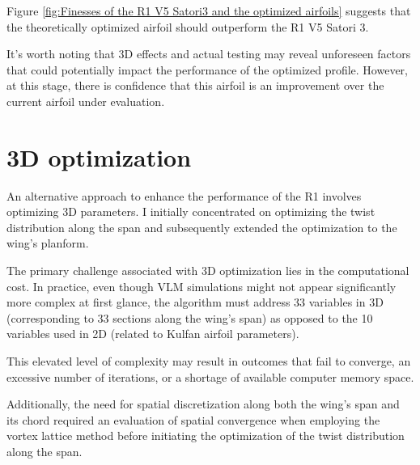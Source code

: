 Figure \ref{fig:Finesses of the R1 V5 Satori3 and the optimized airfoils} suggests that the theoretically optimized airfoil should outperform the R1 V5 Satori 3. 

It's worth noting that 3D effects and actual testing may reveal unforeseen factors that could potentially impact the performance of the optimized profile. However, at this stage, there is confidence that this airfoil is an improvement over the current airfoil under evaluation.



\section{3D optimization}
\label{sec:Ch2.3}

An alternative approach to enhance the performance of the R1 involves optimizing 3D parameters. I initially concentrated on optimizing the twist distribution along the span and subsequently extended the optimization to the wing's planform. 

The primary challenge associated with 3D optimization lies in the computational cost. In practice, even though VLM simulations might not appear significantly more complex at first glance, the algorithm must address 33 variables in 3D (corresponding to 33 sections along the wing's span) as opposed to the 10 variables used in 2D (related to Kulfan airfoil parameters).

This elevated level of complexity may result in outcomes that fail to converge, an excessive number of iterations, or a shortage of available computer memory space.

Additionally, the need for spatial discretization along both the wing's span and its chord required an evaluation of spatial convergence when employing the vortex lattice method before initiating the optimization of the twist distribution along the span.

